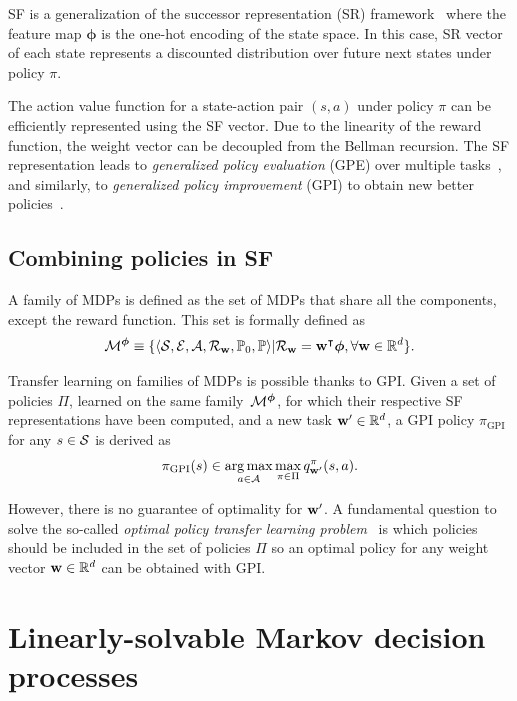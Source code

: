 SF is a generalization of the successor representation (SR) framework~\citep{Dayan1993} where the feature map $\boldsymbol{\phi}$ is the one-hot encoding of the state space. In this case, SR vector of each state represents a discounted distribution over future next states under policy $\pi$. 

The action value function for a state-action pair $(s, a)$ under policy $\pi$ can be efficiently represented using the SF vector. Due to the linearity of the reward function, the weight vector can be decoupled from the Bellman recursion.
The SF representation leads to \textit{generalized policy evaluation} (GPE) over multiple tasks~\citep{Barreto2020a}, and similarly, to \textit{generalized policy improvement} (GPI) to obtain new better policies~\citep{Barreto2017}.
\subsection{Combining policies in SF}
A family of MDPs is defined as the set of MDPs that share all the components, except the reward function. This set is formally defined as 
\begin{equation*}
    \mathcal{M}^{\boldsymbol{\phi}}\equiv\{\langle\mathcal{S},\mathcal{E},\mathcal{A},\mathcal{R}_{\mathbf{w}},\mathbb{P}_0, \mathbb{P}\rangle \lvert \mathcal{R}_{\mathbf{w}} = \mathbf{w}^\intercal \boldsymbol{\phi}, \forall\mathbf{w}\in\mathbb{R}^d\}.
\end{equation*}

Transfer learning on families of MDPs is possible thanks to GPI. Given a set of policies $\Pi$, learned on the same family~$\mathcal{M}^{\boldsymbol{\phi}}$, for which their respective SF representations have been computed, and a new task $\mathbf{w}'\in\mathbb{R}^d$, a GPI policy $\pi_{\text{GPI}}$ for any $s\in\mathcal{S}$ is derived as 
\begin{equation}
    \pi_{\text{GPI}}(s) \in \operatorname*{arg\,max}_{a\in\mathcal{A}} \max_{\pi\in\Pi} q^\pi_{\mathbf{w}'}(s, a).
    \label{eq:gpi}
\end{equation}

However, there is no guarantee of optimality for $\mathbf{w}'$.
A fundamental question to solve the so-called \textit{optimal policy transfer learning problem}~\citep{Alegre2022} is which policies should be included in the set of policies $\Pi$ so an optimal policy for any weight vector $\mathbf{w}\in\mathbb{R}^d$ can be obtained with GPI. 


\section{Linearly-solvable Markov decision processes}

